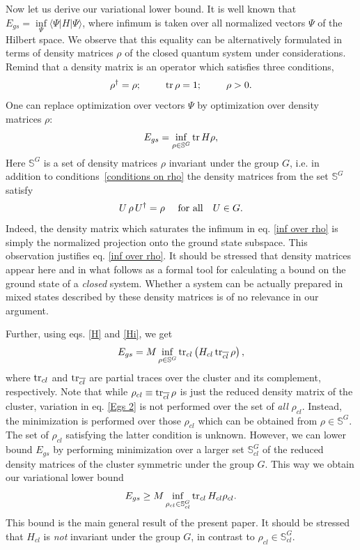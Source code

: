 \documentclass[a4paper]{jpconf}
\renewcommand\[{\begin{equation}}
\renewcommand\]{\end{equation}}
\newcommand{\be}{\begin{equation}}
\newcommand{\ee}{\end{equation}}
\begin{document}
Now let us derive our variational lower bound. It is well known that $E_{gs} =
\inf\limits_{ \Psi}\langle \Psi | H |\Psi\rangle$, where infimum is taken over all normalized vectors $\Psi$ of the Hilbert space.  We observe that this equality can be alternatively formulated in terms of density matrices  $\rho$ of the closed quantum system under considerations. Remind that a density matrix is an operator which satisfies three conditions,
\[{\rho ^ \dagger } = \rho ;\qquad \mathop{\rm{tr}}\rho  = 1;\qquad  \rho  > 0. \label{conditions on rho}\]
One can replace optimization over vectors $\Psi$ by optimization over density matrices $\rho$:
\[\label{inf over rho}
E_{gs} =
\inf\limits_{ \rho \in {\mathbb S}^G} \mathop{\rm{tr}} H \rho,
\]
Here  ${\mathbb S}^G$ is a set of density matrices $\rho$  invariant under the group $G$, i.e. in addition to conditions~\eqref{conditions on rho} the density matrices from the set ${\mathbb S}^G$ satisfy
\be\label{G-invariant rho}
U\,\rho\,U^\dagger=\rho~~~~{\rm for~ all}~~~U\in G.
\ee
Indeed, the density matrix which saturates the infimum in eq. \eqref{inf over rho} is simply the normalized projection onto the ground state subspace. This observation justifies eq. \eqref{inf over rho}. It should be stressed that density matrices appear here and in what follows as a formal tool for calculating a bound on the ground state of a {\it closed} system. Whether a system can be actually prepared in mixed states described by these density matrices is of no relevance in our argument.

 Further, using eqs. \eqref{H} and \eqref{Hi}, we get
\[\label{Egs 2}
E_{gs} =
M \inf\limits_{ \rho \in {\mathbb S}^G} \tr_{cl} \left( H_{cl} \tr_{\overline{cl}}\rho\right),
\]
where $\mathop{\mathrm{tr}}\nolimits_{cl}$ and $\mathop{\mathrm{tr}}\nolimits_{\overline{cl}}$ are partial traces over the cluster and its complement, respectively. Note that while $\rho_{cl}\equiv\mathop{\mathrm{tr}}\nolimits_{\overline{cl}}\rho$ is just the reduced density matrix of the cluster, variation in eq. \eqref{Egs 2} is not performed over the set of {\it all} $\rho_{cl}$. Instead, the minimization is  performed over those $\rho_{cl}$ which can be obtained from $\rho \in {\mathbb S}^G$. The set of $\rho_{cl}$ satisfying the latter condition is unknown. However, we can lower bound $E_{gs}$ by performing minimization over a larger set ${\mathbb S}_{cl}^G$ of the reduced density matrices of the cluster symmetric under the group $G$. This way we obtain our variational lower bound
\[\label{our bound}
E_{gs} \geq
M \inf\limits_{ \rho_{cl} \in {\mathbb S}_{cl}^G} \tr_{cl}  H_{cl} \rho_{cl}.
\]
This bound is the main general result of the present paper. It should be stressed that $H_{cl}$ is {\it not} invariant under  the group $G$, in contrast to $\rho_{cl} \in {\mathbb S}_{cl}^G$.
\end{document}
